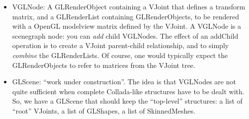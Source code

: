 \begin{itemize}
\item VGLNode: A GLRenderObject containing a VJoint that defines a transform matrix, and a GLRenderList
containing GLRenderObjects, to be rendered with a OpenGL modelview matrix defined by the VJoint.
A VGLNode is a scenegraph node: you can \emph{add}  child VGLNodes. The effect
of an addChild operation is to create a VJoint parent-child relationship, and to
simply \emph{combine} the GLRenderLists. Of course, one would typically expect the GLRenderObjects
to refer to matrices from the VJoint tree.

\item GLScene: ``work under construction''. The idea is that VGLNodes are not quite sufficient
when complete Collada-like structures have to be dealt with.
So, we have a GLScene that should keep the ``top-level'' structures:
a list of ``root'' VJoints, a list of GLShapes, a list of SkinnedMeshes.



\end{itemize}


